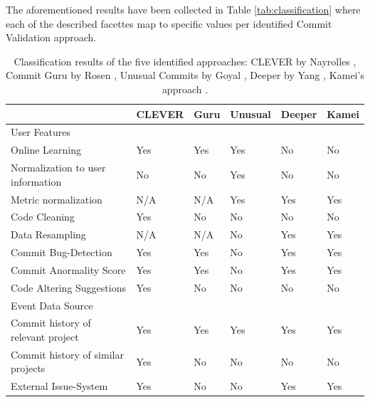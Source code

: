 The aforementioned results have been collected in Table \ref{tab:classification} where each of the described facettes map to specific values per identified Commit Validation approach.


\begin{table}[t]
	\centering
	\caption{Classification results of the five identified approaches: CLEVER by Nayrolles \cite{Nayrolles2018}, Commit Guru by Rosen \cite{Rosen2015}, Unusual Commits by Goyal \cite{Goyal2017}, Deeper by Yang \cite{Yang2015}, Kamei's approach \cite{Kamei2013}.}
	\begin{tabular}{@{}llllll@{}}
		\toprule
		& CLEVER     & Guru   & Unusual & Deeper & Kamei \\ \midrule
		User Features                      &            &        &         &        &       \\ \midrule
		Online Learning                    & Yes        & Yes    & Yes     & No     & No    \\
		Normalization to user information  & No         & No     & Yes     & No     & No    \\
		Metric normalization               & N/A        & N/A    & Yes     & Yes    & Yes   \\
		Code Cleaning                      & Yes        & No     & No      & No     & No    \\
		Data Resampling                    & N/A        & N/A    & No      & Yes    & Yes   \\
		Commit Bug-Detection               & Yes        & Yes    & No      & Yes    & Yes   \\
		Commit Anormality Score            & Yes        & Yes    & No      & Yes    & Yes   \\
		Code Altering Suggestions          & Yes        & No     & No      & No     & No    \\ \midrule
		Event Data Source                  &            &        &         &        &       \\ \midrule
		Commit history of relevant project & Yes        & Yes    & Yes     & Yes    & Yes   \\
		Commit history of similar projects & Yes        & No     & No      & No     & No    \\
		External Issue-System              & Yes        & No     & No      & Yes    & Yes   \\ \midrule

\end{tabular}
\end{table}
